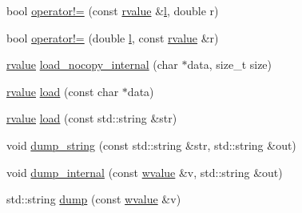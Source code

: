 \begin{DoxyCompactItemize}
\item 
bool \hyperlink{namespacecrow_1_1json_a4b737b3cf606bf2e63ed09ceff8ce89a}{operator!=} (const \hyperlink{classcrow_1_1json_1_1rvalue}{rvalue} \&\hyperlink{three_8min_8js_aae3c400cfa9afd0584b6226ac3804a40}{l}, double r)
\item 
bool \hyperlink{namespacecrow_1_1json_ac606c21e102f1104500667e9060ee0ed}{operator!=} (double \hyperlink{three_8min_8js_aae3c400cfa9afd0584b6226ac3804a40}{l}, const \hyperlink{classcrow_1_1json_1_1rvalue}{rvalue} \&r)
\item 
\hyperlink{classcrow_1_1json_1_1rvalue}{rvalue} \hyperlink{namespacecrow_1_1json_a0cd58f45702772a5aac929dec0966a0a}{load\-\_\-nocopy\-\_\-internal} (char $\ast$data, size\-\_\-t size)
\item 
\hyperlink{classcrow_1_1json_1_1rvalue}{rvalue} \hyperlink{namespacecrow_1_1json_ad995f1379ae1ddc8075cab8185c9a78a}{load} (const char $\ast$data)
\item 
\hyperlink{classcrow_1_1json_1_1rvalue}{rvalue} \hyperlink{namespacecrow_1_1json_a59efe2ae1d83ded364cc3ecc143bce85}{load} (const std\-::string \&str)
\item 
void \hyperlink{namespacecrow_1_1json_af1b84b949166845e81f327e5e43cabee}{dump\-\_\-string} (const std\-::string \&str, std\-::string \&out)
\item 
void \hyperlink{namespacecrow_1_1json_a89aba215e22bb1186515fe0db09d04d8}{dump\-\_\-internal} (const \hyperlink{classcrow_1_1json_1_1wvalue}{wvalue} \&v, std\-::string \&out)
\item 
std\-::string \hyperlink{namespacecrow_1_1json_ad28648d5c8e4d7eaea2777692e5ffec2}{dump} (const \hyperlink{classcrow_1_1json_1_1wvalue}{wvalue} \&v)
\end{DoxyCompactItemize}


